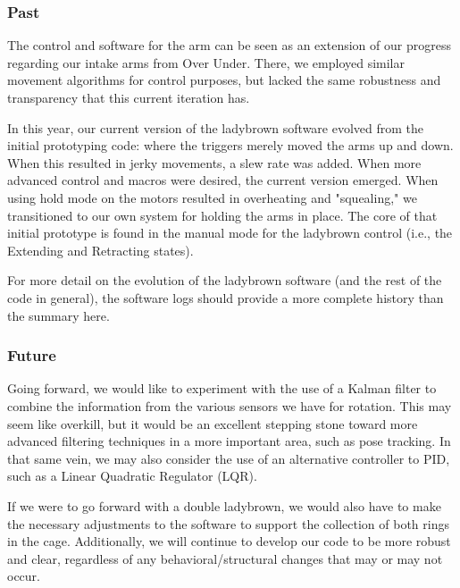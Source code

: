 \subsubsection{Past}
The control and software for the arm can be seen as an extension of our progress regarding our intake arms from Over Under. There, we employed similar movement algorithms for control purposes, but lacked the same robustness and transparency that this current iteration has. 

In this year, our current version of the ladybrown software evolved from the initial prototyping code: where the triggers merely moved the arms up and down. When this resulted in jerky movements, a slew rate was added. When more advanced control and macros were desired, the current version emerged. When using hold mode on the motors resulted in overheating and "squealing," we transitioned to our own system for holding the arms in place. The core of that initial prototype is found in the manual mode for the ladybrown control (i.e., the Extending and Retracting states). 

For more detail on the evolution of the ladybrown software (and the rest of the code in general), the software logs should provide a more complete history than the summary here. 

\subsubsection{Future}
Going forward, we would like to experiment with the use of a Kalman filter to combine the information from the various sensors we have for rotation. This may seem like overkill, but it would be an excellent stepping stone toward more advanced filtering techniques in a more important area, such as pose tracking. In that same vein, we may also consider the use of an alternative controller to PID, such as a Linear Quadratic Regulator (LQR). 

If we were to go forward with a double ladybrown, we would also have to make the necessary adjustments to the software to support the collection of both rings in the cage. Additionally, we will continue to develop our code to be more robust and clear, regardless of any behavioral/structural changes that may or may not occur. 